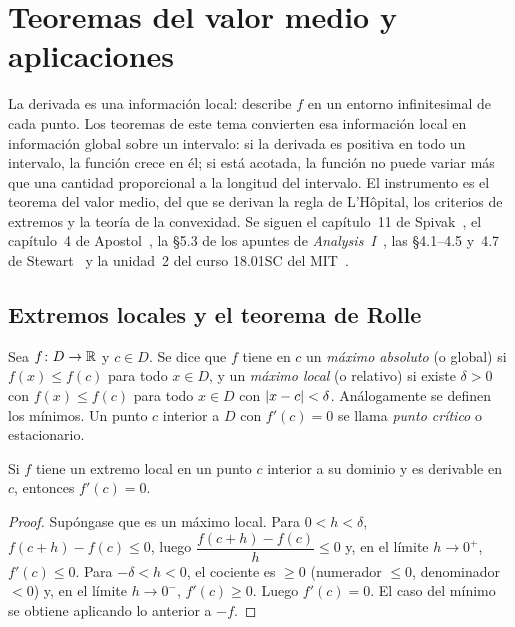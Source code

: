 \chapter{Teoremas del valor medio y aplicaciones}
\label{tema:5}

La derivada es una información local: describe $f$ en un entorno infinitesimal de cada punto. Los teoremas de este tema convierten esa información local en información global sobre un intervalo: si la derivada es positiva en todo un intervalo, la función crece en él; si está acotada, la función no puede variar más que una cantidad proporcional a la longitud del intervalo. El instrumento es el teorema del valor medio, del que se derivan la regla de L'Hôpital, los criterios de extremos y la teoría de la convexidad. Se siguen el capítulo~11 de Spivak~\cite{spivak}, el capítulo~4 de Apostol~\cite{apostol}, la §5.3 de los apuntes de \emph{Analysis~I}~\cite{cambA1}, las §4.1--4.5 y~4.7 de Stewart~\cite{stewart} y la unidad~2 del curso 18.01SC del MIT~\cite{mit1801}.

\section{Extremos locales y el teorema de Rolle}

\begin{definicion}[Extremos]\label{def:extremos}
Sea $f\colon D\to\mathbb{R}$ y $c\in D$. Se dice que $f$ tiene en $c$ un \emph{máximo absoluto} (o global) si $f(x)\le f(c)$ para todo $x\in D$, y un \emph{máximo local} (o relativo) si existe $\delta>0$ con $f(x)\le f(c)$ para todo $x\in D$ con $\lvert x-c\rvert<\delta$. Análogamente se definen los mínimos. Un punto $c$ interior a $D$ con $f'(c)=0$ se llama \emph{punto crítico} o estacionario.
\end{definicion}

\begin{teorema}\label{teo:fermat}
Si $f$ tiene un extremo local en un punto $c$ interior a su dominio y es derivable en $c$, entonces $f'(c)=0$.
\end{teorema}

\begin{proof}
Supóngase que es un máximo local. Para $0<h<\delta$, $f(c+h)-f(c)\le0$, luego $\dfrac{f(c+h)-f(c)}{h}\le0$ y, en el límite $h\to0^{+}$, $f'(c)\le0$. Para $-\delta<h<0$, el cociente es $\ge0$ (numerador $\le0$, denominador $<0$) y, en el límite $h\to0^{-}$, $f'(c)\ge0$. Luego $f'(c)=0$. El caso del mínimo se obtiene aplicando lo anterior a $-f$.
\end{proof}

